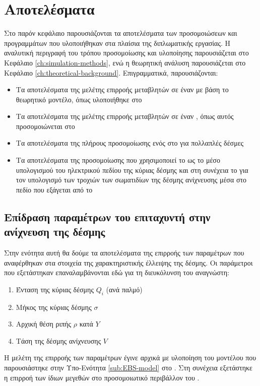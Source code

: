\chapter{Αποτελέσματα}
Στο παρόν κεφάλαιο παρουσιάζονται τα αποτελέσματα των προσομοιώσεων και προγραμμάτων που υλοποιήθηκαν στα πλαίσια της διπλωματικής εργασίας. 
Η αναλυτική περιγραφή του τρόπου προσομοίωσης και υλοποίησης παρουσιάζεται στο Κεφάλαιο \ref{ch:simulation-methods}, ενώ η θεωρητική ανάλυση παρουσιάζεται στο Κεφάλαιο \ref{ch:theoretical-background}.
Επιγραμματικά, παρουσιάζονται:
\begin{itemize}
\item Τα αποτελέσματα της μελέτης επιρροής μεταβλητών σε έναν  με βάση το θεωρητικό μοντέλο, όπως υλοποιήθηκε στο 
\item Τα αποτελέσματα της μελέτης επιρροής μεταβλητών σε έναν , όπως αυτός προσομοιώνεται στο 
\item Τα αποτελέσματα της πλήρους προσομοίωσης ενός  στο  για πολλαπλές δέσμες
\item Τα αποτελέσματα της προσομοίωσης που χρησιμοποιεί το  ως το μέσο υπολογισμού του ηλεκτρικού πεδίου της κύριας δέσμης και στη συνέχεια το  για τον υπολογισμό των τροχιών των σωματιδίων της δέσμης ανίχνευσης μέσα στο πεδίο που εξάγεται από το 
\end{itemize}

\section{Επίδραση παραμέτρων του επιταχυντή στην ανίχνευση της δέσμης}
Στην ενότητα αυτή θα δούμε τα αποτελέσματα της επιρροής των παραμέτρων που αναφέρθηκαν στα στοιχεία της χαρακτηριστικής έλλειψης της δέσμης.
Οι παράμετροι που εξετάστηκαν επαναλαμβάνονται εδώ για τη διευκόλυνση του αναγνώστη:
\begin{enumerate}
	\item Ένταση της κύριας δέσμης $Q_i$ (ανά παλμό)
	\item Μήκος της κύριας δέσμης $\sigma$
	\item Αρχική θέση ριπής $\rho$ κατά $Y$
	\item Τάση της δέσμης ανίχνευσης $V$
\end{enumerate}

Η μελέτη της επιρροής των παραμέτρων έγινε αρχικά με υλοποίηση του μοντέλου που παρουσιάστηκε στην Υπο-Ενότητα \ref{sub:EBS-model} στο .
Στη συνέχεια εξετάστηκε η επιρροή των ίδιων μεγεθών στο προσομοιωτικό περιβάλλον του .

